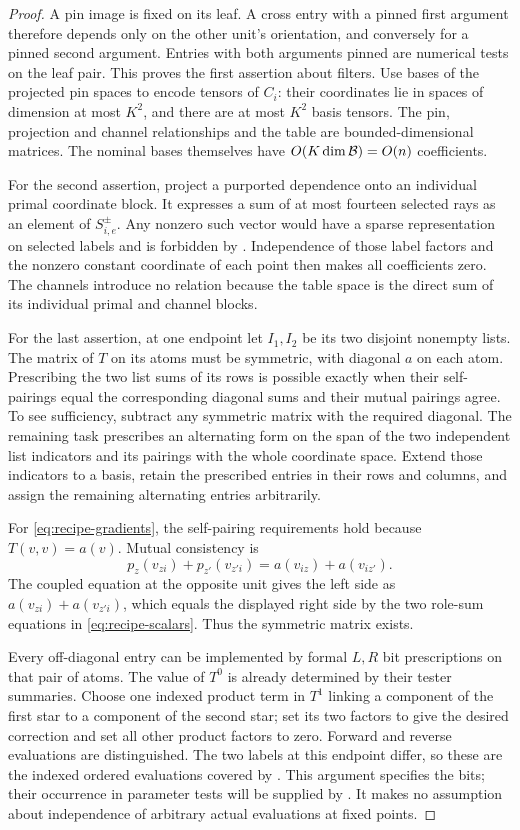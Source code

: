 \begin{proof}
A pin image is fixed on its leaf.  A cross entry with a pinned
first argument therefore depends only on the other unit's
orientation, and conversely for a pinned second argument.
Entries with both arguments pinned are numerical tests on the
leaf pair.  This proves the first assertion about filters.
Use bases of the projected pin spaces to encode tensors of
$C_i$: their coordinates lie in spaces of dimension at most
$K^2$, and there are at most $K^2$ basis tensors.  The pin,
projection and channel relationships and the table are
bounded-dimensional matrices.  The nominal bases themselves
have $O(K\dim\mathcal B)=O(n)$ coefficients.

For the second assertion, project a purported dependence onto
an individual primal coordinate block.  It expresses a sum of
at most fourteen selected rays as an element of $S_{i,e}^{\pm}$.
Any nonzero such vector would have a sparse representation on
selected labels and is forbidden by .
Independence of those label factors and the nonzero constant
coordinate of each point then makes all coefficients zero.
The channels introduce no relation because the table space
is the direct sum of its individual primal and channel blocks.

For the last assertion, at one endpoint let $I_1,I_2$ be its
two disjoint nonempty lists.  The matrix of $T$ on its atoms
must be symmetric, with diagonal $a$ on each atom.
Prescribing the two list sums of its rows is possible exactly
when their self-pairings equal the corresponding diagonal
sums and their mutual pairings agree.  To see sufficiency,
subtract any symmetric matrix with the required diagonal.
The remaining task prescribes an alternating form on the
span of the two independent list indicators and its pairings
with the whole coordinate space.  Extend those indicators to
a basis, retain the prescribed entries in their rows and
columns, and assign the remaining alternating entries
arbitrarily.

For \eqref{eq:recipe-gradients}, the self-pairing requirements
hold because $T(v,v)=a(v)$.  Mutual consistency is
\[
 p_z(v_{zi})+p_{z'}(v_{z'i})
       =a(v_{iz})+a(v_{iz'}).
\]
The coupled equation at the opposite unit gives the left side
as $a(v_{zi})+a(v_{z'i})$, which equals the displayed right side
by the two role-sum equations in \eqref{eq:recipe-scalars}.
Thus the symmetric matrix exists.

Every off-diagonal entry can be implemented by formal $L,R$
bit prescriptions on that pair of atoms.  The value of $T^0$
is already determined by their tester summaries.  Choose one
indexed product term in $T^1$ linking a component of the first
star to a component of the second star; set its two factors to
give the desired correction and set all other product factors
to zero.  Forward and reverse evaluations are distinguished.
The two labels at this endpoint differ, so these are the
indexed ordered evaluations covered by
.  This argument specifies the bits;
their occurrence in parameter tests will be supplied by
.  It makes no assumption about
independence of arbitrary actual evaluations at fixed points.
\end{proof}

